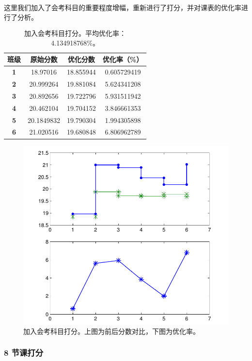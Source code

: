 \documentclass[a4paper]{article}
\begin{document}
   这里我们加入了会考科目的重要程度增幅，重新进行了打分，并对课表的优化率进行了分析。

   \begin{table}[H]
   \centering
   \begin{tabular}{cccc}
   \toprule
   \bf 班级 & \bf 原始分数 & \bf 优化分数 & \bf 优化率（\%）\\
   \midrule
   \bf 1 & 18.97016 & 18.855944 & 0.605729419 \\
   \bf 2 & 20.999264 & 19.881084 & 5.624341208 \\
   \bf 3 & 20.892656 & 19.722796 & 5.931511942 \\
   \bf 4 & 20.462104 & 19.704152 & 3.846661353 \\
   \bf 5 & 20.1849832 & 19.790304 & 1.994305898 \\
   \bf 6 & 21.020516 & 19.680848 & 6.806962789 \\
   \bottomrule
   \end{tabular}
   \caption{加入会考科目打分。平均优化率：4.134918768\%。}
   \end{table}

   \begin{figure}[H]
   \centerline{\includegraphics[scale=0.8]{mark2.pdf}}
   \caption{加入会考科目打分。上图为前后分数对比，下图为优化率。}
   \end{figure}

  \clearpage

  \subsubsection{8 节课打分}
\end{document}

